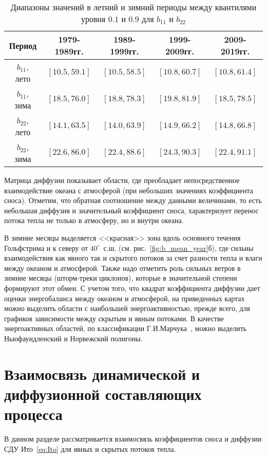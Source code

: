 \begin{table}[h!]
	\centering
	\caption{Диапазоны значений в летний и зимний периоды между квантилями уровня $0.1$ и $0.9$ для $b_{11}$ и $b_{22}$}
	\begin{tabular}{|c|c|c|c|c|}
		\hline
		Период & 1979-1989гг. &  1989-1999гг. & 1999-2009гг. & 2009-2019гг.\\
		\hline
		$b_{11}$, лето & $[10.5, 59.1]$ & $[10.5, 58.5]$ & $[10.8, 60.7]$ & $[10.8, 61.4]$\\ 
		\hline
		$b_{11}$, зима & $[18.5, 76.0]$ & $[18.8, 78.3]$ & $[19.8, 81.9]$ & $[18.5, 78.5]$\\ 
		\hline
		$b_{22}$, лето & $[14.1, 63.5]$ & $[14.0, 63.9]$ & $[14.9, 66.2]$ & $[14.8, 66.8]$\\ 
		\hline
		$b_{22}$, зима & $[22.6, 86.0]$ & $[22.4, 88.6]$ & $[24.3, 90.3]$ & $[22.4, 91.1]$\\ 
		\hline
	\end{tabular}
	\label{tab:quantiles_b}
\end{table}


Матрица диффузии показывает области, где преобладает непосредственное взаимодействие океана с атмосферой (при небольших значениях коэффициента сноса). Отметим, что обратная соотношение между данными величинами, то есть небольшая диффузия и значительный коэффициент сноса,  характеризует перенос потока тепла не только в атмосферу, но и внутри океана.

В зимние месяцы выделяется <<красная>> зона вдоль основного течения Гольфстрима и к северу от $40^\circ$~с.ш. (см. рис.~\ref{fig:b_mean_year}б), %
где сильны взаимодействия как явного так и скрытого потоков за счет разности тепла и влаги между океаном и атмосферой. Также надо отметить роль сильных ветров в зимние месяцы (шторм-треки циклонов), которые в значительной степени формируют этот обмен. С учетом того, что квадрат коэффициента диффузии дает оценки энергобаланса между океаном и атмосферой, на приведенных картах можно выделить области с наибольшей энергоактивностью, прежде всего, для графиков зависимости между скрытым и явным потоками. В качестве энергоактивных областей, по классификации Г.И.Марчука~\cite{marchuk1989}, можно выделить Ньюфаундленский и Норвежский полигоны. 

\section{Взаимосвязь динамической и диффузионной составляющих процесса}
В данном разделе рассматривается взаимосвязь коэффициентов сноса и диффузии СДУ Ито~\eqref{eq:Ito} для явных и скрытых потоков тепла. 

